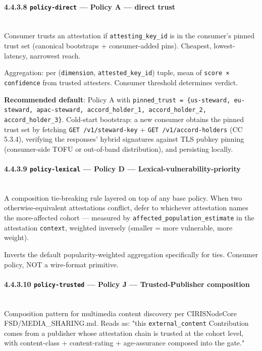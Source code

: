 \documentclass[11pt]{article}
\begin{document}
\paragraph{4.4.3.8 \texttt{policy-direct} — Policy A — direct trust}\mbox{}\\


Consumer trusts an attestation if \texttt{attesting\_key\_id} is in the consumer's pinned trust set (canonical bootstraps + consumer-added pins). Cheapest, lowest-latency, narrowest reach.


Aggregation: per (\texttt{dimension}, \texttt{attested\_key\_id}) tuple, mean of \texttt{score × confidence} from trusted attesters. Consumer threshold determines verdict.


\textbf{Recommended default}: Policy A with \texttt{pinned\_trust = \{us-steward, eu-steward, apac-steward, accord\_holder\_1, accord\_holder\_2, accord\_holder\_3\}}. Cold-start bootstrap: a new consumer obtains the pinned trust set by fetching \texttt{GET /v1/steward-key} + \texttt{GET /v1/accord-holders} (CC 5.3.4), verifying the responses' hybrid signatures against TLS pubkey pinning (consumer-side TOFU or out-of-band distribution), and persisting locally.


\paragraph{4.4.3.9 \texttt{policy-lexical} — Policy D — Lexical-vulnerability-priority}\mbox{}\\


A composition tie-breaking rule layered on top of any base policy. When two otherwise-equivalent attestations conflict, defer to whichever attestation names the more-affected cohort — measured by \texttt{affected\_population\_estimate} in the attestation \texttt{context}, weighted inversely (smaller = more vulnerable, more weight).


Inverts the default popularity-weighted aggregation specifically for ties. Consumer policy, NOT a wire-format primitive.


\paragraph{4.4.3.10 \texttt{policy-trusted} — Policy J — Trusted-Publisher composition}\mbox{}\\


Composition pattern for multimedia content discovery per CIRISNodeCore FSD/MEDIA\_SHARING.md. Reads as: "this \texttt{external\_content} Contribution comes from a publisher whose attestation chain is trusted at the cohort level, with content-class + content-rating + age-assurance composed into the gate."
\end{document}
